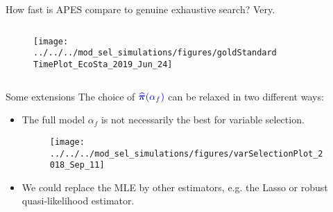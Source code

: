 \documentclass[12pt,aspectratio=169]{beamer}
\newcommand{\bPiHat}{\widehat{\boldsymbol{\pi}}}
\newcommand{\alphaFull}{\alpha_{f}}
\begin{document}
\begin{frame}{How fast is APES compare to genuine exhaustive search?} 
Very. 
%	

\begin{columns}
\begin{column}{0.5\linewidth}
\begin{figure}
	\centering
	\texttt{[image: ../../../mod\_sel\_simulations/figures/goldStandardTimePlot\_EcoSta\_2019\_Jun\_24]}
\end{figure}
\end{column}
\begin{column}{0.5\linewidth}
\begin{figure}
\centering
{}
\end{figure}
\end{column}
\end{columns}
\end{frame}

\begin{frame}{Some extensions}
The choice of $ {\color{blue}\bPiHat(\alphaFull)} $ can be relaxed in two different ways: 
\begin{itemize}
	\item The full model $ \alphaFull $ is not necessarily the best for variable selection. 
\begin{figure}
	\centering
	\texttt{[image: ../../../mod\_sel\_simulations/figures/varSelectionPlot\_2018\_Sep\_11]}
\end{figure}
	\item We could replace the MLE by other estimators, e.g. the Lasso or robust quasi-likelihood estimator.
\end{itemize}
\end{frame}
\end{document}
